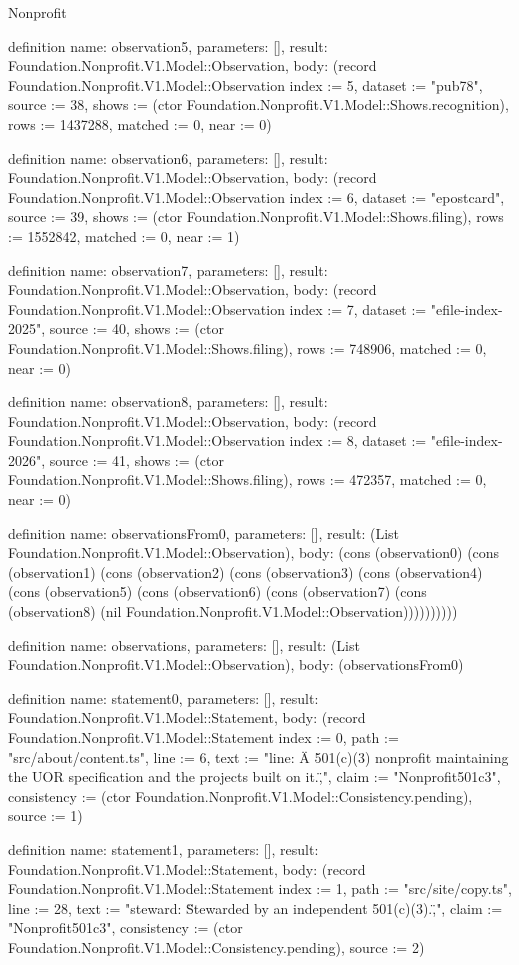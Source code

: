 \begin{lexlean}{Nonprofit}
\begin{semanticmodule}
definition{
  name: observation5,
  parameters: [],
  result: Foundation.Nonprofit.V1.Model::Observation,
  body: (record Foundation.Nonprofit.V1.Model::Observation {index := 5, dataset := "pub78", source := 38, shows := (ctor Foundation.Nonprofit.V1.Model::Shows.recognition), rows := 1437288, matched := 0, near := 0})
}

definition{
  name: observation6,
  parameters: [],
  result: Foundation.Nonprofit.V1.Model::Observation,
  body: (record Foundation.Nonprofit.V1.Model::Observation {index := 6, dataset := "epostcard", source := 39, shows := (ctor Foundation.Nonprofit.V1.Model::Shows.filing), rows := 1552842, matched := 0, near := 1})
}

definition{
  name: observation7,
  parameters: [],
  result: Foundation.Nonprofit.V1.Model::Observation,
  body: (record Foundation.Nonprofit.V1.Model::Observation {index := 7, dataset := "efile-index-2025", source := 40, shows := (ctor Foundation.Nonprofit.V1.Model::Shows.filing), rows := 748906, matched := 0, near := 0})
}

definition{
  name: observation8,
  parameters: [],
  result: Foundation.Nonprofit.V1.Model::Observation,
  body: (record Foundation.Nonprofit.V1.Model::Observation {index := 8, dataset := "efile-index-2026", source := 41, shows := (ctor Foundation.Nonprofit.V1.Model::Shows.filing), rows := 472357, matched := 0, near := 0})
}

definition{
  name: observationsFrom0,
  parameters: [],
  result: (List Foundation.Nonprofit.V1.Model::Observation),
  body: (cons (observation0) (cons (observation1) (cons (observation2) (cons (observation3) (cons (observation4) (cons (observation5) (cons (observation6) (cons (observation7) (cons (observation8) (nil Foundation.Nonprofit.V1.Model::Observation))))))))))
}

definition{
  name: observations,
  parameters: [],
  result: (List Foundation.Nonprofit.V1.Model::Observation),
  body: (observationsFrom0)
}

definition{
  name: statement0,
  parameters: [],
  result: Foundation.Nonprofit.V1.Model::Statement,
  body: (record Foundation.Nonprofit.V1.Model::Statement {index := 0, path := "src/about/content.ts", line := 6, text := "line: \"A 501(c)(3) nonprofit maintaining the UOR specification and the projects built on it.\",", claim := "Nonprofit501c3", consistency := (ctor Foundation.Nonprofit.V1.Model::Consistency.pending), source := 1})
}

definition{
  name: statement1,
  parameters: [],
  result: Foundation.Nonprofit.V1.Model::Statement,
  body: (record Foundation.Nonprofit.V1.Model::Statement {index := 1, path := "src/site/copy.ts", line := 28, text := "steward: \"Stewarded by an independent 501(c)(3).\",", claim := "Nonprofit501c3", consistency := (ctor Foundation.Nonprofit.V1.Model::Consistency.pending), source := 2})
}


\end{semanticmodule}
\end{lexlean}
